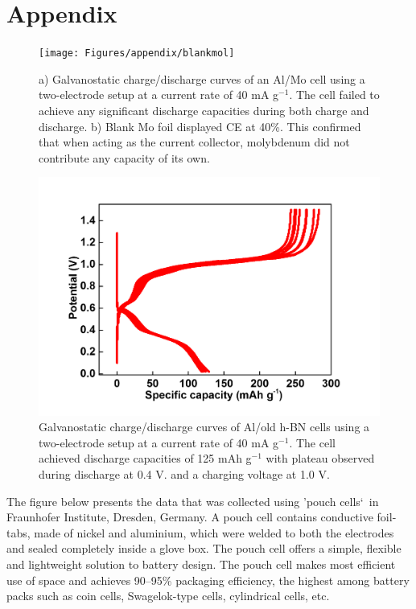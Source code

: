 \chapter{Appendix} %
\label{appA} %
\begin{figure}[tbh!]
\centering
\texttt{[image: Figures/appendix/blankmol]}
\caption{a) Galvanostatic charge/discharge curves of an Al/Mo cell using a two-electrode setup at a current rate of 40 mA g$^{-1}$. The cell failed to achieve any significant discharge capacities during both charge and discharge. b) Blank Mo foil displayed CE at 40\%. This confirmed that when acting as the current collector, molybdenum did not contribute any capacity of its own.}
\label{Figures/appendix:blankmol}
\end{figure}
\begin{figure}[tbh!]
\centering
\includegraphics[width=\textwidth]{Figures/appendix/hBNrepeat}
\caption{Galvanostatic charge/discharge curves of Al/old h-BN cells using a two-electrode setup at a current rate of 40 mA g$^{-1}$. The cell achieved discharge capacities of 125 mAh g$^{-1}$ with plateau observed during discharge at 0.4 V. and a charging voltage at 1.0 V.}
\label{Figures/appendix:hBNrepeat}
\end{figure}
The figure below presents the data that was collected using \rq pouch cells\lq\ in Fraunhofer Institute, Dresden, Germany. A pouch cell contains conductive foil-tabs, made of nickel and aluminium, which were welded to both the electrodes and sealed completely inside a glove box. The pouch cell offers a simple, flexible and lightweight solution to battery design. The pouch cell makes most efficient use of space and achieves 90–95\% packaging efficiency, the highest among battery packs such as coin cells, Swagelok-type cells, cylindrical cells, etc.
